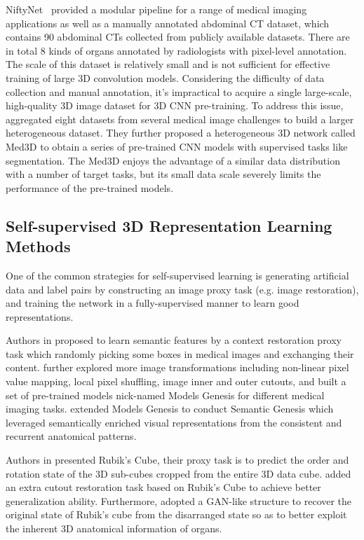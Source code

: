 \documentclass[journal,twoside,web]{ieeecolor}
\begin{document}
NiftyNet~\cite{gibson2018niftynet} provided a modular pipeline for a range of medical imaging applications as well as a manually annotated abdominal CT dataset, which contains 90 abdominal CTs collected from publicly available datasets. 
There are in total 8 kinds of organs annotated by radiologists with pixel-level annotation. The scale of this dataset is relatively small and is not sufficient for effective training of large 3D convolution models. Considering the difficulty of data collection and manual annotation, it's impractical to acquire a single large-scale, high-quality 3D image dataset for 3D CNN pre-training. To address this issue, \cite{chen2019med3d} aggregated eight datasets from several medical image challenges to build a larger heterogeneous dataset. They further proposed a heterogeneous 3D network called Med3D to obtain a series of pre-trained CNN models with supervised tasks like segmentation. The Med3D enjoys the advantage of a similar data distribution with a number of target tasks, but its small data scale severely limits the performance of the pre-trained models.




\subsection{Self-supervised 3D Representation Learning Methods}

One of the common strategies for self-supervised learning is generating artificial data and label pairs by constructing an image proxy task (e.g. image restoration), and training the network in a fully-supervised manner to learn good representations. 

Authors in \cite{chen2019self} proposed to learn semantic features by a context restoration proxy task which randomly picking some boxes in medical images and exchanging their content. \cite{zhou2020models} further explored more image transformations including non-linear pixel value mapping, local pixel shuffling, image inner and outer cutouts, and built a set of pre-trained models nick-named Models Genesis for different medical imaging tasks. \cite{haghighi2020learning} extended Models Genesis to conduct Semantic Genesis which leveraged semantically enriched visual representations from the consistent and recurrent anatomical patterns. 

Authors in \cite{zhuang2019self} presented Rubik's Cube, their proxy task is to predict the order and rotation state of the 3D sub-cubes cropped from the entire 3D data cube. \cite{zhu2020rubik} added an extra cutout restoration task based on Rubik's Cube to achieve better generalization ability. 
Furthermore, \cite{tao2020revisiting} adopted a GAN-like structure to recover the original state of Rubik's cube from the disarranged state so as to better exploit the inherent 3D anatomical information of organs. 
\end{document}
